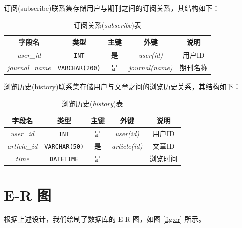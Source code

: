 \documentclass[UTF8,openany]{ctexbook}
\begin{document}
订阅(subscribe)联系集存储用户与期刊之间的订阅关系，其结构如下：

\begin{table}[H]
    \centering
    \begin{tabular}{|c|c|c|c|c|}
        \hline
        \textbf{字段名} & \textbf{类型} & \textbf{主键} & \textbf{外键} & \textbf{说明} \\
        \hline
        \textit{user\_id} & \texttt{INT} & 是 & \textit{user(id)} & 用户ID \\
        \hline
        \textit{journal\_name} & \texttt{VARCHAR(200)} & 是 & \textit{journal(name)} & 期刊名称 \\
        \hline
    \end{tabular}
    \caption{订阅关系(\textit{subscribe})表}
\end{table}

浏览历史(history)联系集存储用户与文章之间的浏览历史关系，其结构如下：

\begin{table}[H]
    \centering
    \begin{tabular}{|c|c|c|c|c|}
        \hline
        \textbf{字段名} & \textbf{类型} & \textbf{主键} & \textbf{外键} & \textbf{说明} \\
        \hline
        \textit{user\_id} & \texttt{INT} & 是 & \textit{user(id)} & 用户ID \\
        \hline
        \textit{article\_id} & \texttt{VARCHAR(50)} & 是 & \textit{article(id)} & 文章ID \\
        \hline
        \textit{time} & \texttt{DATETIME} & 是 &  & 浏览时间 \\
        \hline
    \end{tabular}
    \caption{浏览历史(\textit{history})表}
\end{table}

\section{E-R 图}


根据上述设计，我们绘制了数据库的 E-R 图，如图 \ref{fig:er} 所示。
\end{document}
